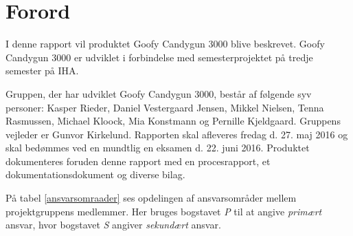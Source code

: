 \chapter{Forord}
I denne rapport vil produktet Goofy Candygun 3000 blive beskrevet. Goofy Candygun 3000 er udviklet i forbindelse med semesterprojektet på tredje semester på IHA. \newline

\noindent Gruppen, der har udviklet Goofy Candygun 3000, består af følgende syv personer: Kasper Rieder, Daniel Vestergaard Jensen, Mikkel Nielsen, Tenna Rasmussen, Michael Kloock, Mia Konstmann og Pernille Kjeldgaard. Gruppens vejleder er Gunvor Kirkelund. Rapporten skal afleveres fredag d. 27. maj 2016 og skal bedømmes ved en mundtlig en eksamen d. 22. juni 2016. Produktet dokumenteres foruden denne rapport med en procesrapport, et dokumentationsdokument og diverse bilag. \newline

\noindent På tabel \ref{ansvarsomraader} ses opdelingen af ansvarsområder mellem projektgruppens medlemmer. Her bruges bogstavet \textit{P} til at angive \textit{primært} ansvar, hvor bogstavet \textit{S} angiver \textit{sekundært} ansvar.

